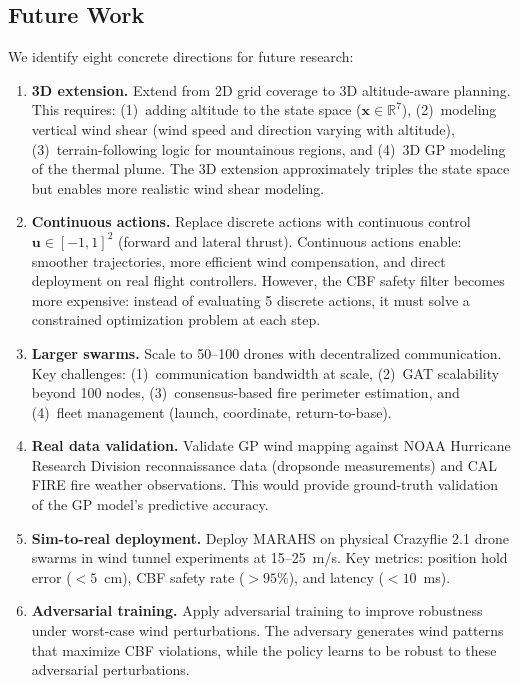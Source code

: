 \documentclass[12pt,a4paper]{article}
\DeclareRobustCommand{\R}{\mathbb{R}}
\DeclareRobustCommand{\vect}[1]{\bm{#1}}
\begin{document}
\subsection{Future Work}

We identify eight concrete directions for future research:

\begin{enumerate}[leftmargin=*]
    \item \textbf{3D extension.} Extend from 2D grid coverage to 3D altitude-aware planning. This requires: (1)~adding altitude to the state space ($\vect{x} \in \R^7$), (2)~modeling vertical wind shear (wind speed and direction varying with altitude), (3)~terrain-following logic for mountainous regions, and (4)~3D GP modeling of the thermal plume. The 3D extension approximately triples the state space but enables more realistic wind shear modeling.
    
    \item \textbf{Continuous actions.} Replace discrete actions with continuous control $\vect{u} \in [-1, 1]^2$ (forward and lateral thrust). Continuous actions enable: smoother trajectories, more efficient wind compensation, and direct deployment on real flight controllers. However, the CBF safety filter becomes more expensive: instead of evaluating 5 discrete actions, it must solve a constrained optimization problem at each step.
    
    \item \textbf{Larger swarms.} Scale to 50--100 drones with decentralized communication. Key challenges: (1)~communication bandwidth at scale, (2)~GAT scalability beyond 100 nodes, (3)~consensus-based fire perimeter estimation, and (4)~fleet management (launch, coordinate, return-to-base).
    
    \item \textbf{Real data validation.} Validate GP wind mapping against NOAA Hurricane Research Division reconnaissance data (dropsonde measurements) and CAL FIRE fire weather observations. This would provide ground-truth validation of the GP model's predictive accuracy.
    
    \item \textbf{Sim-to-real deployment.} Deploy MARAHS on physical Crazyflie 2.1 drone swarms in wind tunnel experiments at 15--25~m/s. Key metrics: position hold error ($< 5$~cm), CBF safety rate ($> 95\%$), and latency ($< 10$~ms).
    
    \item \textbf{Adversarial training.} Apply adversarial training to improve robustness under worst-case wind perturbations. The adversary generates wind patterns that maximize CBF violations, while the policy learns to be robust to these adversarial perturbations.
    

\end{enumerate}
\end{document}
